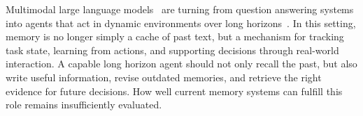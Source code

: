\documentclass{article}
\begin{document}
%


Multimodal large language models~\cite{gpt54,qwen35_2026, claude_opus46_2026} are turning from question answering systems into agents that act in dynamic environments over long horizons~\cite{steinberger2025openclaw, claudecode2026}.  In this setting, memory is no longer simply a cache of past text, but a mechanism for tracking task state, learning from actions, and supporting decisions  through real-world interaction. A capable long horizon agent should not only recall the past, but also write useful information, revise outdated memories, and retrieve the right evidence for future decisions. How well current memory systems can fulfill this role remains insufficiently evaluated.
\end{document}
